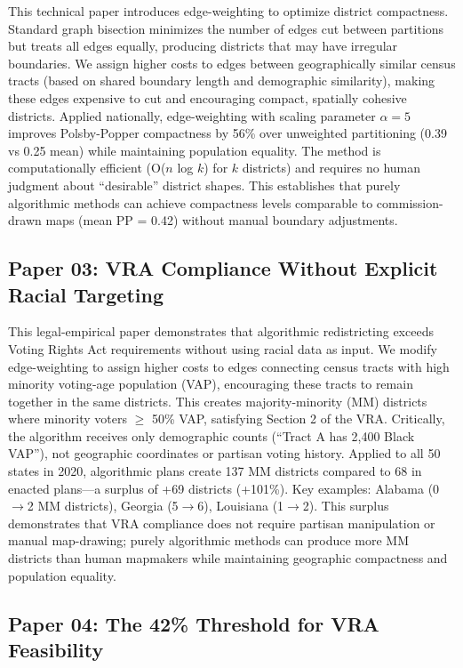 \documentclass[11pt]{article}
\begin{document}
This technical paper introduces edge-weighting to optimize district compactness. Standard graph bisection minimizes the number of edges cut between partitions but treats all edges equally, producing districts that may have irregular boundaries. We assign higher costs to edges between geographically similar census tracts (based on shared boundary length and demographic similarity), making these edges expensive to cut and encouraging compact, spatially cohesive districts. Applied nationally, edge-weighting with scaling parameter $\alpha=5$ improves Polsby-Popper compactness by 56\% over unweighted partitioning (0.39 vs 0.25 mean) while maintaining population equality. The method is computationally efficient (O($n$ log $k$) for $k$ districts) and requires no human judgment about ``desirable'' district shapes. This establishes that purely algorithmic methods can achieve compactness levels comparable to commission-drawn maps (mean PP = 0.42) without manual boundary adjustments.

\subsection*{Paper 03: VRA Compliance Without Explicit Racial Targeting}

This legal-empirical paper demonstrates that algorithmic redistricting exceeds Voting Rights Act requirements without using racial data as input. We modify edge-weighting to assign higher costs to edges connecting census tracts with high minority voting-age population (VAP), encouraging these tracts to remain together in the same districts. This creates majority-minority (MM) districts where minority voters $\geq$ 50\% VAP, satisfying Section 2 of the VRA. Critically, the algorithm receives only demographic counts (``Tract A has 2,400 Black VAP''), not geographic coordinates or partisan voting history. Applied to all 50 states in 2020, algorithmic plans create 137 MM districts compared to 68 in enacted plans---a surplus of +69 districts (+101\%). Key examples: Alabama (0$\rightarrow$2 MM districts), Georgia (5$\rightarrow$6), Louisiana (1$\rightarrow$2). This surplus demonstrates that VRA compliance does not require partisan manipulation or manual map-drawing; purely algorithmic methods can produce more MM districts than human mapmakers while maintaining geographic compactness and population equality.

\subsection*{Paper 04: The 42\% Threshold for VRA Feasibility}
\end{document}
